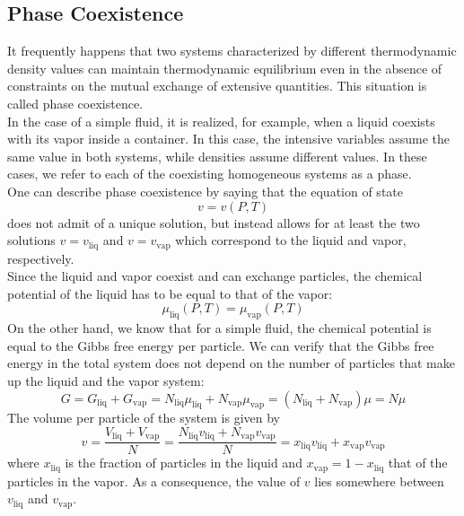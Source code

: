 \subsection{Phase Coexistence}
It frequently happens that two systems characterized by different thermodynamic density values can maintain thermodynamic equilibrium even in the absence of constraints on the mutual exchange of extensive quantities. This situation is called phase coexistence.
\\
In the case of a simple fluid, it is realized, for example, when a liquid coexists with its vapor inside a container. In this case, the intensive variables assume the same value in both systems, while densities assume different values. In these cases, we refer to each of the coexisting homogeneous systems as a phase.
\\
One can describe phase coexistence by saying that the equation of state
\[v = v(P,T)\]
does not admit of a unique solution, but instead allows for at least the two solutions $v = v_{\mathrm{liq}}$ and $v = v_{\mathrm{vap}}$ which correspond to the liquid and vapor, respectively.
\\
Since the liquid and vapor coexist and can exchange particles, the chemical potential of the liquid has to be equal to that of the vapor:
\[\mu_{\mathrm{liq}}(P,T) = \mu_{\mathrm{vap}}(P,T)\]
On the other hand, we know that for a simple fluid, the chemical potential is equal to the Gibbs free energy per particle. We can verify that the Gibbs free energy in the total system does not depend on the number of particles that make up the liquid and the vapor system:
\[G= G_{\mathrm{liq}} + G_{\mathrm{vap}} = N_{\mathrm{liq}}\mu_{\mathrm{liq}} + N_{\mathrm{vap}}\mu_{\mathrm{vap}} = (N_{\mathrm{liq}}+N_{\mathrm{vap}})\mu = N\mu\]
The volume per particle of the system is given by
\[v = \frac{V_{\mathrm{liq}}+V_{\mathrm{vap}}}{N} = \frac{N_{\mathrm{liq}}v_{\mathrm{liq}} + N_{\mathrm{vap}}v_{\mathrm{vap}}}{N} = x_{\mathrm{liq}}v_{\mathrm{liq}}+x_{\mathrm{vap}}v_{\mathrm{vap}}\]
where $x_{\mathrm{liq}}$ is the fraction of particles in the liquid and $x_{\mathrm{vap}} = 1 - x_{\mathrm{liq}}$ that of the particles in the vapor. As a consequence, the value of $v$ lies somewhere between $v_{\mathrm{liq}}$ and $v_{\mathrm{vap}}$.


